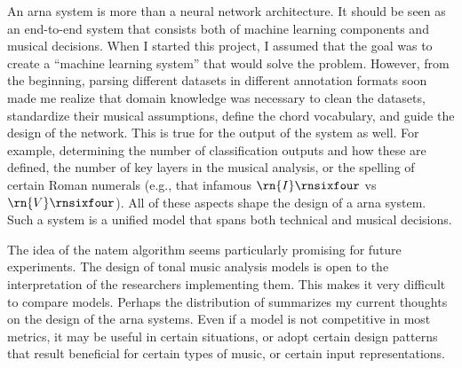 
An \gls{arna} system is more than a neural network
architecture. It should be seen as an end-to-end system that
consists both of machine learning components and musical
decisions. When I started this project, I assumed that the
goal was to create a ``machine learning system'' that would
solve the problem. However, from the beginning, parsing
different datasets in different annotation formats soon made
me realize that domain knowledge was necessary to clean the
datasets, standardize their musical assumptions, define the
chord vocabulary, and guide the design of the network. This
is true for the output of the system as well. For example,
determining the number of classification outputs and how
these are defined, the number of key layers in the musical
analysis, or the spelling of certain Roman numerals (e.g.,
that infamous $\rn{I}\rnsixfour$ vs $\rn{V}\rnsixfour$). All
of these aspects shape the design of a \gls{arna} system.
Such a system is a unified model that spans both technical
and musical decisions.

The idea of the \gls{natem} algorithm seems particularly
promising for future experiments. The design of tonal music
analysis models is open to the interpretation of the
researchers implementing them. This makes it very difficult
to compare models. Perhaps the distribution of
 summarizes my current thoughts on the
design of the \gls{arna} systems. Even if a model is not
competitive in most metrics, it may be useful in certain
situations, or adopt certain design patterns that result
beneficial for certain types of music, or certain input
representations.



